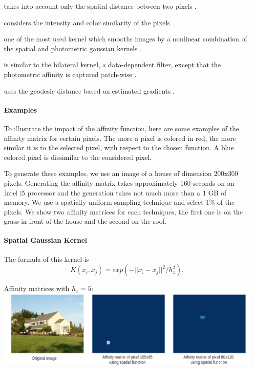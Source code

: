 \begin{description}[align=left]
 \item [Spatial Gaussian Kernel] takes into account only the spatial distance between two pixels \cite{siam_slides_2016}.
 \item [Photometric Gaussian Kernel] considers the intensity and color similarity of the pixels \cite{siam_slides_2016}.
 \item [Bilateral Kernel] one of the most used kernel which smooths images by a nonlinear combination of the spatial and photometric gaussian kernels \cite{siam_slides_2016} \cite{glide_2014}.
 \item [Non-Local Means (NLM)] is similar to the bilateral kernel, a data-dependent filter, except that the photometric affinity is captured patch-wise \cite{glide_2014}.
 \item [Locally Adaptive Regression Kernel (LARK)] uses the geodesic distance based on estimated gradients \cite{milanfar_symmetrizing_2013} \cite{takeda_kernel_2007}.
\end{description}

\paragraph{Examples}

To illustrate the impact of the affinity function, here are some examples of the affinity matrix for certain pixels.
The more a pixel is colored in red, the more similar it is to the selected pixel, with respect to the chosen function.
A blue colored pixel is dissimilar to the considered pixel.

To generate these examples, we use an image of a house of dimension 200x300 pixels. Generating the affinity matrix takes approximately 160 seconds on an Intel i5 processor and the generation takes not much more than a 1 GB of memory. We use a spatially uniform sampling technique and select 1\% of the pixels. We show two affinity matrices for each techniques, the first one is on the grass in front of the house and the second on the roof.

\paragraph{Spatial Gaussian Kernel}
The formula of this kernel is
\[K(x_i, x_j) = exp(-||x_i - x_j||^2 / h_x^2).\]

Affinity matrices with \(h_x = 5\): \\
\includegraphics[width=\textwidth]{img/spatialAffinitySigma5.png}

